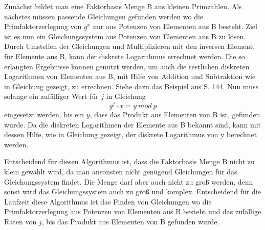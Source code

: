 		Zunächst bildet man eine Faktorbasis Menge B aus kleinen Primzahlen. Als nächstes müssen passende Gleichungen gefunden werden wo die Primfaktorzerlegung von $g^x$ nur aus Potenzen von Elementen aus B besteht. Ziel ist es nun ein Gleichungssystem aus Potenzen von Elementen aus B zu lösen. Durch Umstellen der Gleichungen und Multiplizieren mit den inversen Element, für Elemente aus B, kann der diskrete Logarithmus errechnet werden. Die so erlangten Ergebnisse können genutzt werden, um auch die restlichen diskreten Logarithmen von Elementen aus B, mit Hilfe von Addition und Subtraktion wie in Gleichung  gezeigt, zu errechnen. Siehe dazu das Beispiel aus \cite{Elliptic:Curves:Number:Theory:and:Cryptography} S. 144. Nun muss solange ein zufälliger Wert für $j$ in Gleichung
		\begin{equation}
			g^j \cdot x = y~mod~p
			\label{Gleichung Diskreten Logarithmus Gleichung 2}
		\end{equation}
		eingesetzt werden, bis ein $y$, dass das Produkt aus Elementen von B ist, gefunden wurde. Da die diskreten Logarithmen der Elemente aus B bekannt sind, kann mit dessen Hilfe, wie in Gleichung  gezeigt, der diskrete Logarithmus von y berechnet werden.
		
		Entscheidend für diesen Algorithmus ist, dass die Faktorbasis Menge B nicht zu klein gewählt wird, da man ansonsten nicht genügend Gleichungen für das Gleichungssystem findet. Die Menge darf aber auch nicht zu groß werden, denn sonst wird das Gleichungssystem auch zu groß und komplex. Entscheidend für die Laufzeit diese Algorithmus ist das Finden von Gleichungen wo die Primfaktorzerlegung aus Potenzen von Elementen aus B besteht und das zufällige Raten von $j$, bis das Produkt aus Elementen von B gefunden wurde.